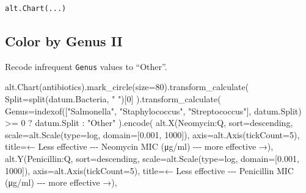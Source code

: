 \documentclass[
  letterpaper,
  DIV=11,
  numbers=noendperiod]{scrartcl}
\newenvironment{Shaded}{\begin{snugshade}}{\end{snugshade}}
\newcommand{\BuiltInTok}[1]{\textcolor[rgb]{0.00,0.23,0.31}{#1}}
\newcommand{\DecValTok}[1]{\textcolor[rgb]{0.68,0.00,0.00}{#1}}
\newcommand{\FloatTok}[1]{\textcolor[rgb]{0.68,0.00,0.00}{#1}}
\newcommand{\NormalTok}[1]{\textcolor[rgb]{0.00,0.23,0.31}{#1}}
\newcommand{\OperatorTok}[1]{\textcolor[rgb]{0.37,0.37,0.37}{#1}}
\newcommand{\StringTok}[1]{\textcolor[rgb]{0.13,0.47,0.30}{#1}}
\begin{document}
\begin{verbatim}
alt.Chart(...)
\end{verbatim}

\subsection{Color by Genus II}\label{color-by-genus-ii}

Recode infrequent \texttt{Genus} values to ``Other''.

\begin{Shaded}
\begin{Highlighting}[]
\NormalTok{alt.Chart(antibiotics).mark\_circle(size}\OperatorTok{=}\DecValTok{80}\NormalTok{).transform\_calculate(}
\NormalTok{  Split}\OperatorTok{=}\StringTok{\textquotesingle{}split(datum.Bacteria, " ")[0]\textquotesingle{}}
\NormalTok{).transform\_calculate(}
\NormalTok{  Genus}\OperatorTok{=}\StringTok{\textquotesingle{}indexof(["Salmonella", "Staphylococcus", "Streptococcus"], datum.Split) \textgreater{}= 0 ? datum.Split : "Other"\textquotesingle{}}
\NormalTok{).encode(}
\NormalTok{    alt.X(}\StringTok{\textquotesingle{}Neomycin:Q\textquotesingle{}}\NormalTok{,}
\NormalTok{          sort}\OperatorTok{=}\StringTok{\textquotesingle{}descending\textquotesingle{}}\NormalTok{,}
\NormalTok{          scale}\OperatorTok{=}\NormalTok{alt.Scale(}\BuiltInTok{type}\OperatorTok{=}\StringTok{\textquotesingle{}log\textquotesingle{}}\NormalTok{, domain}\OperatorTok{=}\NormalTok{[}\FloatTok{0.001}\NormalTok{, }\DecValTok{1000}\NormalTok{]),}
\NormalTok{          axis}\OperatorTok{=}\NormalTok{alt.Axis(tickCount}\OperatorTok{=}\DecValTok{5}\NormalTok{),}
\NormalTok{          title}\OperatorTok{=}\StringTok{\textquotesingle{}← Less effective {-}{-}{-} Neomycin MIC (μg/ml) {-}{-}{-} more effective →\textquotesingle{}}\NormalTok{),}
\NormalTok{    alt.Y(}\StringTok{\textquotesingle{}Penicillin:Q\textquotesingle{}}\NormalTok{,}
\NormalTok{          sort}\OperatorTok{=}\StringTok{\textquotesingle{}descending\textquotesingle{}}\NormalTok{,}
\NormalTok{          scale}\OperatorTok{=}\NormalTok{alt.Scale(}\BuiltInTok{type}\OperatorTok{=}\StringTok{\textquotesingle{}log\textquotesingle{}}\NormalTok{, domain}\OperatorTok{=}\NormalTok{[}\FloatTok{0.001}\NormalTok{, }\DecValTok{1000}\NormalTok{]),}
\NormalTok{          axis}\OperatorTok{=}\NormalTok{alt.Axis(tickCount}\OperatorTok{=}\DecValTok{5}\NormalTok{),}
\NormalTok{          title}\OperatorTok{=}\StringTok{\textquotesingle{}← Less effective {-}{-}{-} Penicillin MIC (μg/ml) {-}{-}{-} more effective →\textquotesingle{}}\NormalTok{),}

\end{Highlighting}
\end{Shaded}
\end{document}
